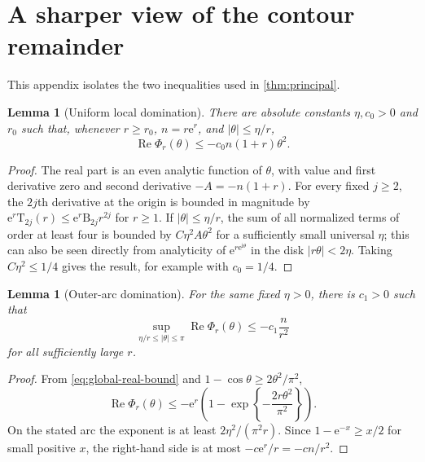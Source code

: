 \documentclass[11pt,a4paper]{article}
\newtheorem{lemma}[theorem]{Lemma}
\theoremstyle{definition}
\newcommand{\Bell}{\mathrm B}
\newcommand{\Touch}{\mathrm T}
\newcommand{\ee}{\mathrm e}
\newcommand{\ii}{\mathrm i}
\DeclareMathOperator{\RePart}{Re}
\begin{document}
\appendix

\section{A sharper view of the contour remainder}

This appendix isolates the two inequalities used in
\cref{thm:principal}.

\begin{lemma}[Uniform local domination]\label{lem:local-domination}
There are absolute constants $\eta,c_0>0$ and $r_0$ such that, whenever
$r\ge r_0$, $n=r\ee^r$, and $|\theta|\le\eta/r$,
\begin{equation}\label{eq:local-domination-app}
 \RePart\Phi_r(\theta)\le-c_0n(1+r)\theta^2.
\end{equation}
\end{lemma}

\begin{proof}
The real part is an even analytic function of $\theta$, with value and first
derivative zero and second derivative $-A=-n(1+r)$.  For every fixed
$j\ge2$, the $2j$th derivative at the origin is bounded in magnitude by
$\ee^r\Touch_{2j}(r)\le\ee^r\Bell_{2j}r^{2j}$ for $r\ge1$.  If
$|\theta|\le\eta/r$, the sum of all normalized terms of order at least four is
bounded by $C\eta^2A\theta^2$ for a sufficiently small universal $\eta$; this
can also be seen directly from analyticity of
$\ee^{r\ee^{\ii\theta}}$ in the disk $|r\theta|<2\eta$.  Taking
$C\eta^2\le1/4$ gives the result, for example with $c_0=1/4$.
\end{proof}

\begin{lemma}[Outer-arc domination]\label{lem:outer-domination}
For the same fixed $\eta>0$, there is $c_1>0$ such that
\begin{equation}\label{eq:outer-domination-app}
 \sup_{\eta/r\le|\theta|\le\pi}\RePart\Phi_r(\theta)
 \le-c_1\frac{n}{r^2}
\end{equation}
for all sufficiently large $r$.
\end{lemma}

\begin{proof}
From \eqref{eq:global-real-bound} and
$1-\cos\theta\ge2\theta^2/\pi^2$,
\[
 \RePart\Phi_r(\theta)
 \le-\ee^r\left(1-
 \exp\left\{-\frac{2r\theta^2}{\pi^2}\right\}\right).
\]
On the stated arc the exponent is at least $2\eta^2/(\pi^2r)$.  Since
$1-\ee^{-x}\ge x/2$ for small positive $x$, the right-hand side is at most
$-c\ee^r/r=-cn/r^2$.
\end{proof}
\end{document}
